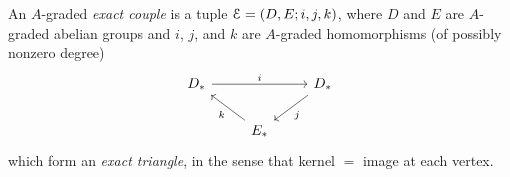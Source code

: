 \documentclass[../main.tex]{subfiles}
\begin{document}
\begin{definition}
    An $A$-graded \emph{exact couple} is a tuple $\mathcal E=(D,E;i,j,k)$, where $D$ and $E$ are $A$-graded abelian groups and $i$, $j$, and $k$ are $A$-graded homomorphisms (of possibly nonzero degree)
    \[\begin{tikzcd}
        {D_*} && {D_*} \\
        & {E_*}
        \arrow["i", from=1-1, to=1-3]
        \arrow["j", from=1-3, to=2-2]
        \arrow["k", from=2-2, to=1-1]
    \end{tikzcd}\]
    which form an \emph{exact triangle}, in the sense that kernel $=$ image at each vertex.
\end{definition}
\end{document}
